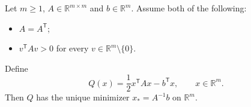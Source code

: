 Let $m\geq1$, $A\in\mathbb R^{m\times m}$ and $b\in\mathbb R^m$.
Assume both of the following:
\begin{itemize}
\item $A=A^{\mathsf T}$;
\item $v^{\mathsf T}Av>0$ for every $v\in\mathbb R^m\setminus\{0\}$.
\end{itemize}
Define
\[
Q(x)=\frac12 x^{\mathsf T}Ax-b^{\mathsf T}x,
\qquad x\in\mathbb R^m.
\]
Then $Q$ has the unique minimizer $x_*=A^{-1}b$ on $\mathbb R^m$.
